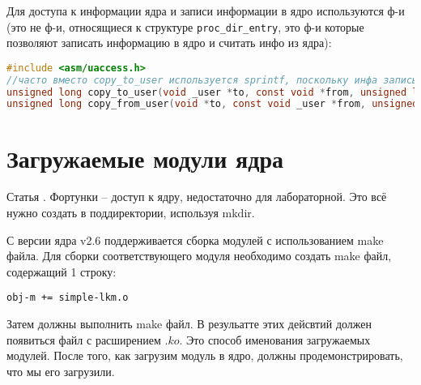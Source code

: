  

Для доступа к информации ядра и записи информации в ядро используются ф-и (это не ф-и, относящиеся к структуре \verb|proc_dir_entry|, это ф-и которые позволяют записать информацию в ядро и считать инфо из ядра):
\begin{lstlisting}[language=c]
#include <asm/uaccess.h>
//часто вместо copy_to_user используется sprintf, поскольку инфа записывается в буфер 
unsigned long copy_to_user(void _user *to, const void *from, unsigned long n); 
unsigned long copy_from_user(void *to, const void _user *from, unsigned long n);
\end{lstlisting}

\section{Загружаемые модули ядра}
Статья \cite{IBM_lproc}. 
Фортунки – доступ к ядру, недостаточно для лабораторной. Это всё нужно создать в поддиректории, используя mkdir.

С версии ядра v2.6 поддерживается сборка модулей с использованием make файла. Для сборки соответствующего модуля необходимо создать make файл, содержащий 1 строку: 
\begin{lstlisting}[label=proc_mkdir, caption=make file]
obj-m += simple-lkm.o
\end{lstlisting}

Затем должны выполнить make файл. В резульатте этих дейсвтий должен появиться файл с расширением $.ko$. Это способ именования загружаемых модулей. После того, как загрузим модуль в ядро, должны продемонстрировать, что мы его загрузили.

